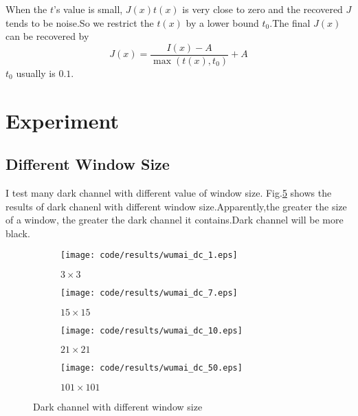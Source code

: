 \documentclass[journal,comsoc]{IEEEtran}
\begin{document}
When the $t$'s value is small, $J(x)t(x)$ is very close to zero and the recovered $J$ tends to be noise.So we restrict
the $t(x)$ by a lower bound $t_0$.The final $J(x)$ can be recovered by
\begin{equation}
  \label{eq:final-recovered-jx}
  J(x)=\frac{I(x)-A}{\max{(t(x),t_0)}}+A
\end{equation}
$t_0$ usually is $0.1$.

\section{Experiment}
\label{sec:experiment}

\subsection{Different Window Size}
\label{subsec:different-window-size}

I test many dark channel with different value of window size. Fig.\ref{fig:dark-channel-with-different-window-size} shows the results of
dark chanenl with different window size.Apparently,the greater the size of a window, the greater the dark channel it
contains.Dark channel will be more black.
\begin{figure}[!htb]
  \centering
  \begin{subfigure}{.5\textwidth}
    \centering
    \texttt{[image: code/results/wumai\_dc\_1.eps]}
    \caption{$3\times3$}
    \label{subfig:3x3}
  \end{subfigure}
  \begin{subfigure}{.5\textwidth}
    \centering
    \texttt{[image: code/results/wumai\_dc\_7.eps]}
    \caption{$15\times15$}
    \label{subfig:15x15}
  \end{subfigure}
  \begin{subfigure}{0.5\textwidth}
    \centering
    \texttt{[image: code/results/wumai\_dc\_10.eps]}
    \caption{$21\times21$}
    \label{subfig:21x21}
  \end{subfigure}
  \begin{subfigure}{0.5\textwidth}
    \centering
    \texttt{[image: code/results/wumai\_dc\_50.eps]}
    \caption{$101\times101$}
    \label{subfig:101x101}
  \end{subfigure}
  \caption{Dark channel with different window size}
  \label{fig:dark-channel-with-different-window-size}
\end{figure}
\end{document}

